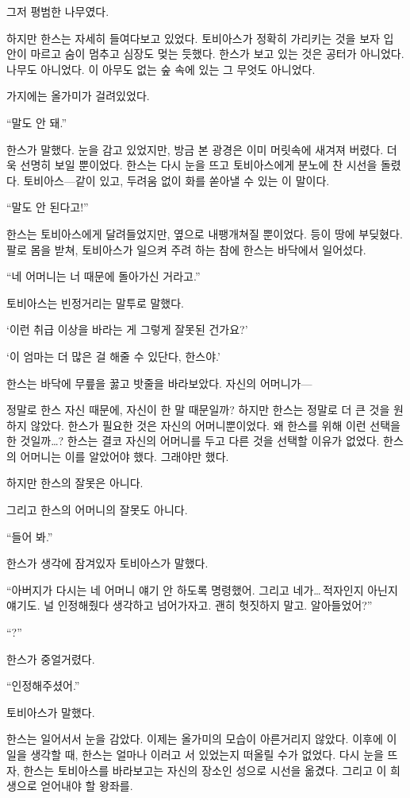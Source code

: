 그저 평범한 나무였다.

하지만 한스는 자세히 들여다보고 있었다. 토비아스가 정확히 가리키는 것을 보자 입 안이 마르고 숨이 멈추고 심장도 멎는 듯했다. 한스가 보고 있는 것은 공터가 아니었다. 나무도 아니었다. 이 아무도 없는 숲 속에 있는 그 무엇도 아니었다.

가지에는 올가미가 걸려있었다.

``말도 안 돼.''

한스가 말했다. 눈을 감고 있었지만, 방금 본 광경은 이미 머릿속에 새겨져 버렸다. 더욱 선명히 보일 뿐이었다. 한스는 다시 눈을 뜨고 토비아스에게 분노에 찬 시선을 돌렸다. 토비아스—같이 있고, 두려움 없이 화를 쏟아낼 수 있는 이 말이다.

``말도 안 된다고!''

한스는 토비아스에게 달려들었지만, 옆으로 내팽개쳐질 뿐이었다. 등이 땅에 부딪혔다. 팔로 몸을 받쳐, 토비아스가 일으켜 주려 하는 참에 한스는 바닥에서 일어섰다.

``네 어머니는 너 때문에 돌아가신 거라고.''

토비아스는 빈정거리는 말투로 말했다.

`이런 취급 이상을 바라는 게 그렇게 잘못된 건가요?'

`이 엄마는 더 많은 걸 해줄 수 있단다, 한스야.'

한스는 바닥에 무릎을 꿇고 밧줄을 바라보았다. 자신의 어머니가—

정말로 한스 자신 때문에, 자신이 한 말 때문일까? 하지만 한스는 정말로 더 큰 것을 원하지 않았다. 한스가 필요한 것은 자신의 어머니뿐이었다. 왜 한스를 위해 이런 선택을 한 것일까\ldots? 한스는 결코 자신의 어머니를 두고 다른 것을 선택할 이유가 없었다. 한스의 어머니는 이를 알았어야 했다. 그래야만 했다.

하지만 한스의 잘못은 아니다.

그리고 한스의 어머니의 잘못도 아니다.

``들어 봐.''

한스가 생각에 잠겨있자 토비아스가 말했다. 

``아버지가 다시는 네 어머니 얘기 안 하도록 명령했어. 그리고 네가\ldots\,적자인지 아닌지 얘기도. 널 인정해줬다 생각하고 넘어가자고. 괜히 헛짓하지 말고. 알아들었어?''

``?''

한스가 중얼거렸다.

``인정해주셨어.''

토비아스가 말했다.

한스는 일어서서 눈을 감았다. 이제는 올가미의 모습이 아른거리지 않았다. 이후에 이 일을 생각할 때, 한스는 얼마나 이러고 서 있었는지 떠올릴 수가 없었다. 다시 눈을 뜨자, 한스는 토비아스를 바라보고는 자신의 장소인 성으로 시선을 옮겼다. 그리고 이 희생으로 얻어내야 할 왕좌를.


